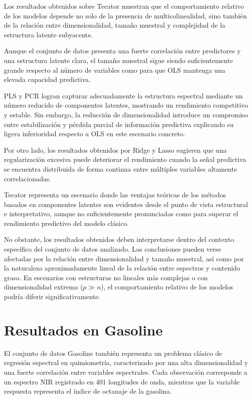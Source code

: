\documentclass[12pt,a4paper]{report}
\begin{document}
Los resultados obtenidos sobre Tecator muestran que el comportamiento relativo de los modelos depende no solo de la presencia de multicolinealidad, sino también de la relación entre dimensionalidad, tamaño muestral y complejidad de la estructura latente subyacente.

Aunque el conjunto de datos presenta una fuerte correlación entre predictores y una estructura latente clara, el tamaño muestral sigue siendo suficientemente grande respecto al número de variables como para que OLS mantenga una elevada capacidad predictiva.

PLS y PCR logran capturar adecuadamente la estructura espectral mediante un número reducido de componentes latentes, mostrando un rendimiento competitivo y estable. Sin embargo, la reducción de dimensionalidad introduce un compromiso entre estabilización y pérdida parcial de información predictiva explicando su ligera inferioridad respecto a OLS en este escenario concreto.

Por otro lado, los resultados obtenidos por Ridge y Lasso sugieren que una regularización excesiva puede deteriorar el rendimiento cuando la señal predictiva se encuentra distribuida de forma continua entre múltiples variables altamente correlacionadas.

Tecator representa un escenario donde las ventajas teóricas de los métodos basados en componentes latentes son evidentes desde el punto de vista estructural e interpretativo, aunque no suficientemente pronunciadas como para superar el rendimiento predictivo del modelo clásico.

No obstante, los resultados obtenidos deben interpretarse dentro del contexto específico del conjunto de datos analizado. Las conclusiones pueden verse afectadas por la relación entre dimensionalidad y tamaño muestral, así como por la naturaleza aproximadamente lineal de la relación entre espectros y contenido graso. En escenarios con estructuras no lineales más complejas o con dimensionalidad extrema ($p \gg n$), el comportamiento relativo de los modelos podría diferir significativamente.

\section{Resultados en Gasoline}

El conjunto de datos Gasoline también representa un problema clásico de regresión espectral en quimiometría, caracterizado por una alta dimensionalidad y una fuerte correlación entre variables espectrales. Cada observación corresponde a un espectro NIR registrado en 401 longitudes de onda, mientras que la variable respuesta representa el índice de octanaje de la gasolina.
\end{document}
